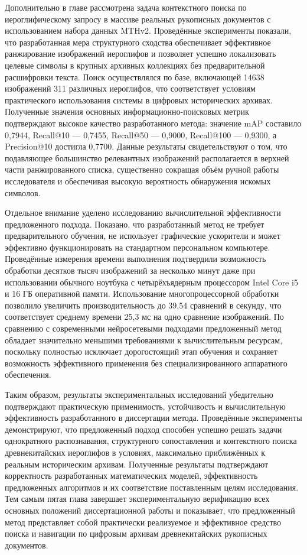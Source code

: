 Дополнительно в главе рассмотрена задача контекстного поиска по иероглифическому запросу в массиве реальных рукописных документов с использованием набора данных MTHv2. Проведённые эксперименты показали, что разработанная мера структурного сходства обеспечивает эффективное ранжирование изображений иероглифов и позволяет успешно локализовать целевые символы в крупных архивных коллекциях без предварительной расшифровки текста. Поиск осуществлялся по базе, включающей 14638 изображений 311 различных иероглифов, что соответствует условиям практического использования системы в цифровых исторических архивах. Полученные значения основных информационно-поисковых метрик подтверждают высокое качество разработанного метода: значение mAP составило 0,7944, Recall@10 — 0,7455, Recall@50 — 0,9000, Recall@100 — 0,9300, а Precision@10 достигла 0,7700. Данные результаты свидетельствуют о том, что подавляющее большинство релевантных изображений располагается в верхней части ранжированного списка, существенно сокращая объём ручной работы исследователя и обеспечивая высокую вероятность обнаружения искомых символов.

Отдельное внимание уделено исследованию вычислительной эффективности предложенного подхода. Показано, что разработанный метод не требует предварительного обучения, не использует графические ускорители и может эффективно функционировать на стандартном персональном компьютере. Проведённые измерения времени выполнения подтвердили возможность обработки десятков тысяч изображений за несколько минут даже при использовании обычного ноутбука с четырёхъядерным процессором Intel Core i5 и 16 ГБ оперативной памяти. Использование многопроцессорной обработки позволило увеличить производительность до 39,54 сравнений в секунду, что соответствует среднему времени 25,3 мс на одно сравнение изображений. По сравнению с современными нейросетевыми подходами предложенный метод обладает значительно меньшими требованиями к вычислительным ресурсам, поскольку полностью исключает дорогостоящий этап обучения и сохраняет возможность эффективного применения без специализированного аппаратного обеспечения.

Таким образом, результаты экспериментальных исследований убедительно подтверждают практическую применимость, устойчивость и вычислительную эффективность разработанного в диссертации метода. Проведённые эксперименты демонстрируют, что предложенный подход способен успешно решать задачи однократного распознавания, структурного сопоставления и контекстного поиска древнекитайских иероглифов в условиях, максимально приближённых к реальным историческим архивам. Полученные результаты подтверждают корректность разработанных математических моделей, эффективность предложенных алгоритмов и их соответствие поставленным целям исследования. Тем самым пятая глава завершает экспериментальную верификацию всех основных положений диссертационной работы и показывает, что предложенный метод представляет собой практически реализуемое и эффективное средство поиска и навигации по цифровым архивам древнекитайских рукописных документов.

\clearpage